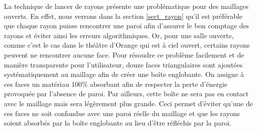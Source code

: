 La technique de lancer de rayons présente une problématique pour des maillages ouverts. En effet, nous verrons dans la section \ref{sect_rayon} qu'il est préférable que chaque rayon puisse rencontrer une paroi afin d'assurer le bon comptage des rayons et éviter ainsi les erreurs algorithmiques. Or, pour une salle ouverte, comme c'est le cas dans le théâtre d'Orange qui est à ciel ouvert, certains rayons peuvent ne rencontrer aucune face. Pour résoudre ce problème facilement et de manière transparente pour l'utilisateur, douze faces triangulaires sont ajoutées systématiquement au maillage afin de créer une boîte englobante. On assigne à ces faces un matériau 100\% absorbant afin de respecter la perte d'énergie provoquée par l'absence de paroi. Par ailleurs, cette boîte ne sera pas en contact avec le maillage mais sera légèrement plus grande. Ceci permet d'éviter qu'une de ces faces ne soit confondue avec une paroi réelle du maillage et que les rayons soient absorbés par la boîte englobante au lieu d'être réfléchis par la paroi.

